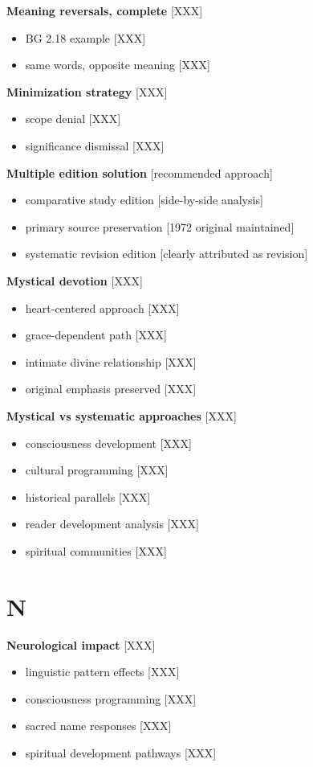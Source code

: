 \documentclass[11pt,twoside]{book}
\begin{document}
\textbf{\textbf{Meaning reversals, complete}} {[}XXX]
\begin{itemize}
\item BG 2.18 example [XXX]
\item same words, opposite meaning [XXX]
\end{itemize}

\textbf{\textbf{Minimization strategy}} {[}XXX]
\begin{itemize}
\item scope denial [XXX]
\item significance dismissal [XXX]
\end{itemize}

\textbf{\textbf{Multiple edition solution}} {[}recommended approach]
\begin{itemize}
\item comparative study edition [side-by-side analysis]
\item primary source preservation [1972 original maintained]
\item systematic revision edition [clearly attributed as revision]
\end{itemize}

\textbf{\textbf{Mystical devotion}} {[}XXX]
\begin{itemize}
\item heart-centered approach [XXX]
\item grace-dependent path [XXX]
\item intimate divine relationship [XXX]
\item original emphasis preserved [XXX]
\end{itemize}

\textbf{\textbf{Mystical vs systematic approaches}} {[}XXX]
\begin{itemize}
\item consciousness development [XXX]
\item cultural programming [XXX]
\item historical parallels [XXX]
\item reader development analysis [XXX]
\item spiritual communities [XXX]
\end{itemize}
\section*{N}
\label{sec:org9b2d9aa}

\textbf{\textbf{Neurological impact}} {[}XXX]
\begin{itemize}
\item linguistic pattern effects [XXX]
\item consciousness programming [XXX]
\item sacred name responses [XXX]
\item spiritual development pathways [XXX]
\end{itemize}
\end{document}

